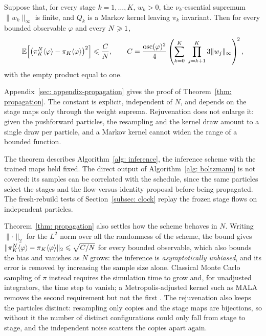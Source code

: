 \documentclass{article}
\begin{document}
\begin{theorem}
\label{thm: propagation}
Suppose that, for every stage $k=1,\dots,K$, $w_k>0$, the $\nu_k$-essential supremum $\lVert w_k \rVert_\infty$ is finite, and $Q_k$ is a Markov kernel leaving $\pi_k$ invariant. Then for every bounded observable $\varphi$ and every $N \geqslant 1$,
\begin{equation}
    \mathbb E\Bigl[\bigl(\pi_K^N\langle \varphi\rangle - \pi_K\langle \varphi\rangle\bigr)^{2}\Bigr]
    \leqslant \frac{C}{N},
    \qquad
    C = \frac{\operatorname{osc}(\varphi)^{2}}{4}
    \left(\sum_{k=0}^{K}\ \prod_{j=k+1}^{K} 3\lVert w_j \rVert_\infty\right)^{\!2},
    \label{eq: propagation-bound}
\end{equation}
with the empty product equal to one.
\end{theorem}
\noindent
Appendix~\ref{sec: appendix-propagation} gives the proof of Theorem~\ref{thm: propagation}. The constant is explicit, independent of $N$, and depends on the stage maps only through the weight suprema. Rejuvenation does not enlarge it: given the pushforward particles, the resampling and the kernel draw amount to a single draw per particle, and a Markov kernel cannot widen the range of a bounded function.

\begin{remark}
The theorem describes Algorithm~\ref{alg: inference}, the inference scheme with the trained maps held fixed. The direct output of Algorithm~\ref{alg: boltzmann} is not covered: its samples can be correlated with the schedule, since the same particles select the stages and the flow-versus-identity proposal before being propagated. The fresh-rebuild tests of Section~\ref{subsec: clock} replay the frozen stage flows on independent particles.
\end{remark}

Theorem~\ref{thm: propagation} also settles how the scheme behaves in $N$. Writing $\lVert\cdot\rVert_2$ for the $L^2$ norm over all the randomness of the scheme, the bound gives $\lVert \pi_K^N\langle \varphi\rangle - \pi_K\langle \varphi\rangle \rVert_2 \leqslant \sqrt{C/N}$ for every bounded observable, which also bounds the bias and vanishes as $N$ grows: the inference is \emph{asymptotically unbiased}, and its error is removed by increasing the sample size alone. Classical Monte Carlo sampling of $\pi$ instead requires the simulation time to grow and, for unadjusted integrators, the time step to vanish; a Metropolis-adjusted kernel such as MALA removes the second requirement but not the first \citep{metropolis1953equation,hastings1970monte,roberts1996exponential,delmoral2004feynman}. The rejuvenation also keeps the particles distinct: resampling only copies and the stage maps are bijections, so without it the number of distinct configurations could only fall from stage to stage, and the independent noise scatters the copies apart again.
\end{document}
